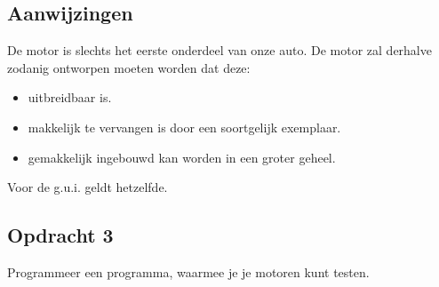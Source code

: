 \documentclass[fleqn,11pt]{article}
\begin{document}
\subsection*{Aanwijzingen}
De motor is slechts het eerste onderdeel van onze auto. De motor zal derhalve zodanig ontworpen moeten worden dat deze:
\begin{itemize}
\item uitbreidbaar is.
\item makkelijk te vervangen is door een soortgelijk exemplaar.
\item gemakkelijk ingebouwd kan worden in een groter geheel.
\end{itemize}
Voor de g.u.i. geldt hetzelfde. 

\subsection*{Opdracht 3}
Programmeer een programma, waarmee je je motoren kunt testen. 

\begin{center}
\end{center}
\end{document}
